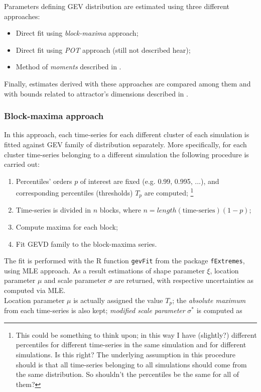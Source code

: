 \documentclass{article}
\begin{document}
Parameters defining GEV distribution are estimated using three different approaches:

\begin{itemize}
	\item Direct fit using \textit{block-maxima} approach;
	\item Direct fit using \textit{POT} approach (still not described hear);
	\item Method of \textit{moments} described in \cite{LucariniExtremesBook}.
\end{itemize}
Finally, estimates derived with these approaches are compared among them and with bounds related to attractor's dimensions described in \cite{Galfi}.

\subsubsection{Block-maxima approach}

In this approach, each time-series for each different cluster of each simulation is fitted against GEV family of distribution separately. More specifically, for each cluster time-series belonging to a different simulation the following procedure is carried out:

\begin{enumerate}
	\item Percentiles' orders $p$ of interest are fixed (e.g. 0.99, 0.995, ...), and corresponding percentiles (thresholds) $T_p$ are computed; \footnote{This could be something to think upon; in this way I have (slightly?) different percentiles for different time-series in the same simulation and for different simulations. Is this right? The underlying assumption in this procedure should is that all time-series belonging to all simulations should come from the same distribution. So shouldn't the percentiles be the same for all of them?\label{fn1}}
	\item Time-series is divided in $n$ blocks, where $n=length(\text{time-series})(1-p)$;
	\item Compute maxima for each block;
	\item Fit GEVD family to the block-maxima series.
\end{enumerate}

The fit is performed with the R function \texttt{gevFit} from the package \texttt{fExtremes}, using MLE approach. As a result estimations of shape parameter $\xi$, location parameter $\mu$ and scale parameter $\sigma$ are returned, with respective uncertainties as computed via MLE.\\
Location parameter $\mu$ is actually assigned the value $T_p$; the \textit{absolute maximum} from each time-series is also kept; \textit{modified scale parameter} $\sigma^*$ is computed as
\end{document}
